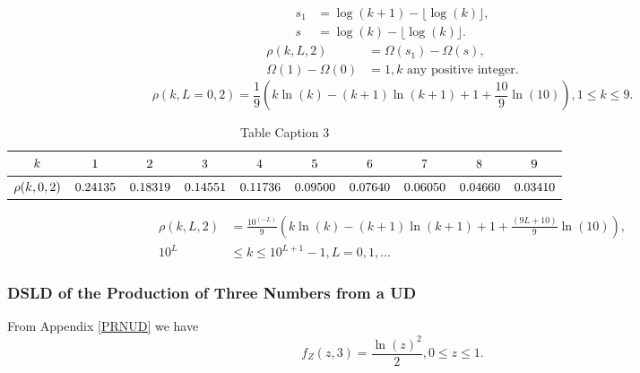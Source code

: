 \documentclass[titlepage,fleqn]{article}%
\begin{document}
\begin{align*}
s_{1} &  =\log(k+1)-\lfloor\log(k)\rfloor,\\
s &  =\log(k)-\lfloor\log(k)\rfloor.
\end{align*}%
\begin{align*}
\rho(k,L,2) &  =\Omega(s_{1})-\Omega(s),\\
\Omega(1)-\Omega(0) &  =1,k\text{ \ any positive integer.}%
\end{align*}%
\begin{equation}
\rho(k,L=0,2)=\frac{1}{9}\left(  k\ln(k)-(k+1)\ln(k+1)+1+\frac{10}{9}%
\ln(10)\right)  ,1\leq k\leq9.\label{Prod1}%
\end{equation}%
\begin{table}[!htbp] \centering
\begin{tabular}
[c]{|c|c|c|c|c|c|c|c|c|c|}\hline\hline
${\small k}$ & ${\small 1}$ & ${\small 2}$ & ${\small 3}$ & ${\small 4}$ &
${\small 5}$ & ${\small 6}$ & ${\small 7}$ & ${\small 8}$ & ${\small 9}%
$\\\hline
${\small \rho(k,0,2)}$ & ${\small 0.24135}$ & ${\small 0.18319}$ &
${\small 0.14551}$ & ${\small 0.11736}$ & ${\small 0.09500}$ &
${\small 0.07640}$ & ${\small 0.06050}$ & ${\small 0.04660}$ &
${\small 0.03410}$\\\hline\hline
\end{tabular}
\caption{Table Caption 3}\label{TableKey3}%
\end{table}%
\begin{align}
\rho(k,L,2) &  =\frac{10^{\left(  -L\right)  }}{9}\left(  k\ln(k)-(k+1)\ln
(k+1)+1+\frac{\left(  9L+10\right)  }{9}\ln(10)\right)  ,\label{Prod2}\\
10^{L} &  \leq k\leq10^{L+1}-1,L=0,1,\ldots\nonumber
\end{align}


\subsubsection{DSLD of the Production of Three Numbers from a UD}%

\label{Pro3}%


From Appendix
\ref{PRNUD}
we have
\[
f_{Z}(z,3)=\frac{\ln(z)^{2}}{2},0\leq z\leq1.
\]
%
\end{document}
